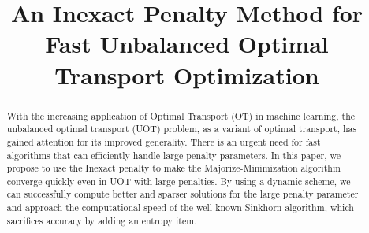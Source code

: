\documentclass[conference]{IEEEtran}
\begin{document}
\title{An Inexact Penalty Method for Fast Unbalanced Optimal Transport Optimization
}

\author{
\and
{}
\and
{}
\and
{}
\and
{}
\and
{}
}

\maketitle

\begin{abstract}
With the increasing application of Optimal Transport (OT) in machine learning, the unbalanced optimal transport (UOT) problem, as a variant of optimal transport, has gained attention for its improved generality. There is an urgent need for fast algorithms that can efficiently handle large penalty parameters. In this paper, we propose to use the Inexact penalty to make the Majorize-Minimization algorithm converge quickly even in UOT with large penalties. By using a dynamic scheme, we can successfully compute better and sparser solutions for the large penalty parameter and approach the computational speed of the well-known Sinkhorn algorithm, which sacrifices accuracy by adding an entropy item.
\end{abstract}
\end{document}

